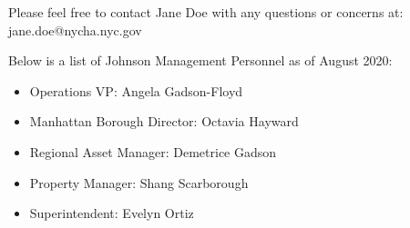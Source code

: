 {    Please feel free to contact Jane Doe with any questions or concerns at: jane.doe@nycha.nyc.gov

    Below is a list of Johnson Management Personnel as of August 2020:
    \begin{itemize}
    \item Operations VP: Angela Gadson-Floyd
    \item Manhattan Borough Director: Octavia Hayward
    \item Regional Asset Manager: Demetrice Gadson
    \item Property Manager: Shang Scarborough
    \item Superintendent: Evelyn Ortiz
    \end{itemize}
    }